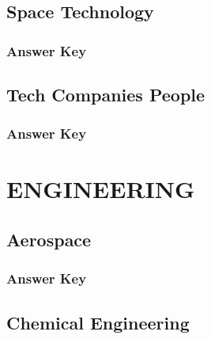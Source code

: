 \documentclass[12pt,a4paper]{book}
\newcounter{totalcounter}
\begin{document}


\setcounter{totalcounter}{1}

\section{Space Technology}



\subsection*{Answer Key}



\setcounter{totalcounter}{1}

\section{Tech Companies People}



\subsection*{Answer Key}



\chapter{ENGINEERING}

\setcounter{totalcounter}{1}

\section{Aerospace}



\subsection*{Answer Key}



\setcounter{totalcounter}{1}

\section{Chemical Engineering}
\end{document}

